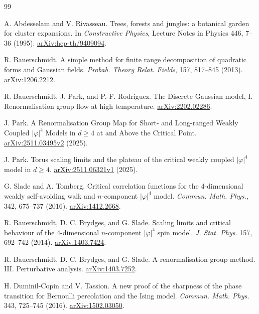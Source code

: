 \documentclass[11pt]{article}
\begin{document}
\begin{thebibliography}{99}

A. Abdesselam and V. Rivasseau.
\newblock Trees, forests and jungles: a botanical garden for cluster expansions.
\newblock In \emph{Constructive Physics}, Lecture Notes in Physics 446,
7--36 (1995).
\newblock \href{https://arxiv.org/abs/hep-th/9409094}{arXiv:hep-th/9409094}.


R. Bauerschmidt.
\newblock A simple method for finite range decomposition of quadratic forms
and Gaussian fields.
\newblock \emph{Probab. Theory Relat. Fields}, 157, 817--845 (2013).
\newblock \href{https://arxiv.org/abs/1206.2212}{arXiv:1206.2212}.

R. Bauerschmidt, J. Park, and P.-F. Rodriguez.
\newblock The Discrete Gaussian model, I. Renormalisation group flow at high temperature.
\newblock \href{https://arxiv.org/abs/2202.02286}{arXiv:2202.02286}.

J. Park.
\newblock A Renormalisation Group Map for Short- and Long-ranged Weakly
Coupled \(\lvert\varphi\rvert^4\) Models in \(d\ge4\) at and Above the Critical Point.
\newblock \href{https://arxiv.org/html/2511.03495v2}{arXiv:2511.03495v2} (2025).

J. Park.
\newblock Torus scaling limits and the plateau of the critical weakly
coupled \(\lvert\varphi\rvert^4\) model in \(d\ge4\).
\newblock \href{https://arxiv.org/html/2511.06321v1}{arXiv:2511.06321v1} (2025).

G. Slade and A. Tomberg.
\newblock Critical correlation functions for the 4-dimensional weakly
self-avoiding walk and \(n\)-component \(\lvert\varphi\rvert^4\) model.
\newblock \emph{Commun. Math. Phys.}, 342, 675--737 (2016).
\newblock \href{https://arxiv.org/abs/1412.2668}{arXiv:1412.2668}.


R. Bauerschmidt, D. C. Brydges, and G. Slade.
\newblock Scaling limits and critical behaviour of the 4-dimensional
\(n\)-component \(\lvert\varphi\rvert^4\) spin model.
\newblock \emph{J. Stat. Phys.} 157, 692--742 (2014).
\newblock \href{https://arxiv.org/abs/1403.7424}{arXiv:1403.7424}.

R. Bauerschmidt, D. C. Brydges, and G. Slade.
\newblock A renormalisation group method. III. Perturbative analysis.
\newblock \href{https://arxiv.org/abs/1403.7252}{arXiv:1403.7252}.

H. Duminil-Copin and V. Tassion.
\newblock A new proof of the sharpness of the phase transition for
Bernoulli percolation and the Ising model.
\newblock \emph{Commun. Math. Phys.} 343, 725--745 (2016).
\newblock \href{https://arxiv.org/abs/1502.03050}{arXiv:1502.03050}.
\end{thebibliography}
\end{document}
